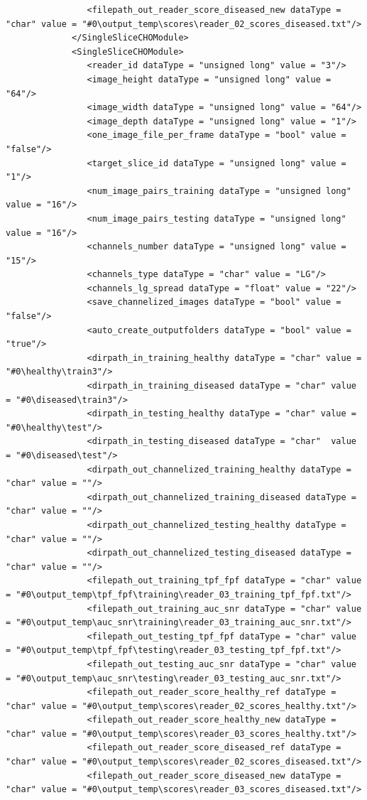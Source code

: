 \begin{lstlisting}
				<filepath_out_reader_score_diseased_new dataType = "char" value = "#0\output_temp\scores\reader_02_scores_diseased.txt"/>
			 </SingleSliceCHOModule>
			 <SingleSliceCHOModule>
				<reader_id dataType = "unsigned long" value = "3"/>
				<image_height dataType = "unsigned long" value = "64"/>
				<image_width dataType = "unsigned long" value = "64"/>
				<image_depth dataType = "unsigned long" value = "1"/>
				<one_image_file_per_frame dataType = "bool" value = "false"/>
				<target_slice_id dataType = "unsigned long" value = "1"/>
				<num_image_pairs_training dataType = "unsigned long" value = "16"/>
				<num_image_pairs_testing dataType = "unsigned long" value = "16"/>
				<channels_number dataType = "unsigned long" value = "15"/>	
				<channels_type dataType = "char" value = "LG"/>
				<channels_lg_spread dataType = "float" value = "22"/>
				<save_channelized_images dataType = "bool" value = "false"/>
				<auto_create_outputfolders dataType = "bool" value = "true"/>
				<dirpath_in_training_healthy dataType = "char" value = "#0\healthy\train3"/>
				<dirpath_in_training_diseased dataType = "char" value = "#0\diseased\train3"/>
				<dirpath_in_testing_healthy dataType = "char" value = "#0\healthy\test"/>
				<dirpath_in_testing_diseased dataType = "char"  value = "#0\diseased\test"/>
				<dirpath_out_channelized_training_healthy dataType = "char" value = ""/>
				<dirpath_out_channelized_training_diseased dataType = "char" value = ""/>
				<dirpath_out_channelized_testing_healthy dataType = "char" value = ""/>
				<dirpath_out_channelized_testing_diseased dataType = "char" value = ""/>
				<filepath_out_training_tpf_fpf dataType = "char" value = "#0\output_temp\tpf_fpf\training\reader_03_training_tpf_fpf.txt"/>
				<filepath_out_training_auc_snr dataType = "char" value = "#0\output_temp\auc_snr\training\reader_03_training_auc_snr.txt"/>
				<filepath_out_testing_tpf_fpf dataType = "char" value = "#0\output_temp\tpf_fpf\testing\reader_03_testing_tpf_fpf.txt"/>
				<filepath_out_testing_auc_snr dataType = "char" value = "#0\output_temp\auc_snr\testing\reader_03_testing_auc_snr.txt"/>
				<filepath_out_reader_score_healthy_ref dataType = "char" value = "#0\output_temp\scores\reader_02_scores_healthy.txt"/>
				<filepath_out_reader_score_healthy_new dataType = "char" value = "#0\output_temp\scores\reader_03_scores_healthy.txt"/>
				<filepath_out_reader_score_diseased_ref dataType = "char" value = "#0\output_temp\scores\reader_02_scores_diseased.txt"/>
				<filepath_out_reader_score_diseased_new dataType = "char" value = "#0\output_temp\scores\reader_03_scores_diseased.txt"/>

\end{lstlisting}
